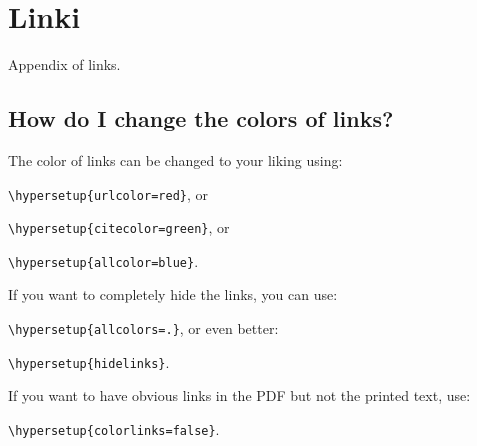 
\chapter{Linki} %
Appendix of links.
\label{AppendixA} %

\section{How do I change the colors of links?}

\noindent The color of links can be changed to your liking using:

{\small\verb!\hypersetup{urlcolor=red}!}, or

{\small\verb!\hypersetup{citecolor=green}!}, or

{\small\verb!\hypersetup{allcolor=blue}!}.

\noindent If you want to completely hide the links, you can use:

{\small\verb!\hypersetup{allcolors=.}!}, or even better: 

{\small\verb!\hypersetup{hidelinks}!}.

\noindent If you want to have obvious links in the PDF but not the printed text, use:

{\small\verb!\hypersetup{colorlinks=false}!}.
